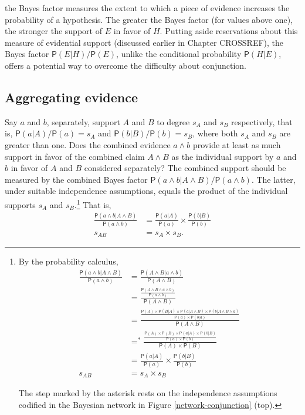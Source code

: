 \documentclass[10pt,dvipsnames,enabledeprecatedfontcommands]{scrartcl}
\newcommand{\et}{\wedge}
\newcommand{\pr}[1]{\mathsf{P}(#1)}
\begin{document}
\noindent the Bayes factor measures the extent to which a piece of
evidence increases the probability of a hypothesis. The greater the
Bayes factor (for values above one), the stronger the support of \(E\)
in favor of \(H\). Putting aside reservations about this measure of
evidential support (discussed earlier in Chapter CROSSREF), the Bayes
factor \(\pr{E | H}/\pr{E}\), unlike the conditional probability
\(\pr{H | E}\), offers a potential way to overcome the difficulty about
conjunction.

\hypertarget{aggregating-evidence}{%
\subsection{Aggregating evidence}\label{aggregating-evidence}}

Say \(a\) and \(b\), separately, support \(A\) and \(B\) to degree
\(s_A\) and \(s_B\) respectively, that is, \(\pr{a | A}/\pr{a}=s_A\) and
\(\pr{b | B}/\pr{b}=s_B\), where both \(s_A\) and \(s_B\) are greater
than one. Does the combined evidence \(a \wedge b\) provide at least as
much support in favor of the combined claim \(A \wedge B\) as the
individual support by \(a\) and \(b\) in favor of \(A\) and \(B\)
considered separately? The combined support should be measured by the
combined Bayes factor \(\pr{a \wedge b| A\wedge B}/\pr{a \wedge b}\).
The latter, under suitable independence assumptions, equals the product
of the individual supports \(s_{A}\) and
\(s_{B}\).\footnote{By the probability calculus,
 \begin{align*}
\frac{\pr{a \wedge b| A\wedge B}}{\pr{a \wedge b}} & =  \frac{\pr{A \et B| a\wedge b}}{\pr{A \et B}}\\
& =  \frac{\frac{ \pr{A \et B \et a \wedge b }}{\pr{a \et b}}}{\pr{A \et B}} \\ 
& =  \frac{\frac{ \pr{A} \times \pr{B|A} \times \pr{a | A \wedge B} \times \pr{b | A \wedge B \wedge a}}{\pr{a} \times \pr{b | a}}}{\pr{A \et B}} \\ 
& =^*  \frac{\frac{\pr{A} \times \pr{B} \times \pr{a | A} \times \pr{b | B}}{\pr{a} \times \pr{b}}}{\pr{A} \times \pr{B}} \\ 
& =  \frac{\pr{a |A}}{\pr{a}} \times \frac{\pr{b |B}}{\pr{b}} \\
s_{AB}& =  s_{A}\times s_{B} 
 \end{align*}

\noindent
The step marked by the asterisk rests on the 
independence assumptions codified in the Bayesian network 
in Figure \ref{network-conjunction} (top).} That is, \begin{align*}
\frac{\pr{a \wedge b| A\wedge B}}{\pr{a \wedge b}} & =  \frac{\pr{a |A}}{\pr{a}} \times \frac{\pr{b |B}}{\pr{b}} \\
s_{AB}& =  s_{A}\times s_{B}.
 \end{align*}
\end{document}
